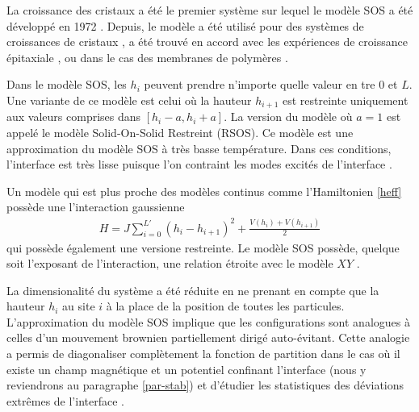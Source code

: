 La croissance des cristaux a été le premier système sur lequel le modèle SOS a été développé en 1972 \cite{gilmer_simulation_1972}. Depuis, le modèle a été utilisé pour des systèmes de croissances de cristaux \cite{elwenspoek_kinetic_1987}, a été trouvé en accord avec les expériences de croissance épitaxiale \cite{wilby_scaling_1992}, ou dans le cas des membranes de polymères \cite{gompper_steric_1989}.

Dans le modèle SOS, les $h_i$ peuvent prendre n'importe quelle valeur en tre $0$ et $L$. Une variante de ce modèle est celui où la hauteur $h_{i+1}$ est restreinte uniquement aux valeurs comprises dans $[h_i-a,h_i+a]$. La version du modèle où $a=1$ est appelé le modèle Solid-On-Solid Restreint (RSOS)\cite{privman_transfer-matrix_1989}. Ce modèle est une approximation du modèle SOS à très basse température.  Dans ces conditions, l'interface est très lisse puisque l'on contraint les modes excités de l'interface \cite{kim_conserved_1994,vaysburd_critical_1995}. 

Un modèle qui est plus proche des modèles continus comme l'Hamiltonien \ref{heff} possède une l'interaction gaussienne
\begin{align}
    H = J \sum_{i=0}^{L'} (h_i-h_{i+1})^2 + \frac{V(h_i)+V(h_{i+1})}{2}
    \label{hamil-gsos}
\end{align}
qui possède également une versione restreinte. Le modèle SOS possède, quelque soit l'exposant de l'interaction, une relation étroite avec le modèle $XY$ \cite{knops_exact_1977}.

La dimensionalité du système a été réduite en ne prenant en compte que la hauteur $h_i$ au site $i$ à la place de la position de toutes les particules. L'approximation du modèle SOS implique que les configurations sont analogues à celles d'un mouvement brownien partiellement dirigé auto-évitant. Cette analogie a permis de diagonaliser complètement la fonction de partition dans le cas où il existe un champ magnétique et un potentiel confinant l'interface (nous y reviendrons au paragraphe \ref{par-stab}) \cite{owczarek_exact_1993} et d'étudier les statistiques des déviations extrêmes de l'interface \cite{majumdar_airy_2005,schehr_universal_2006}.


